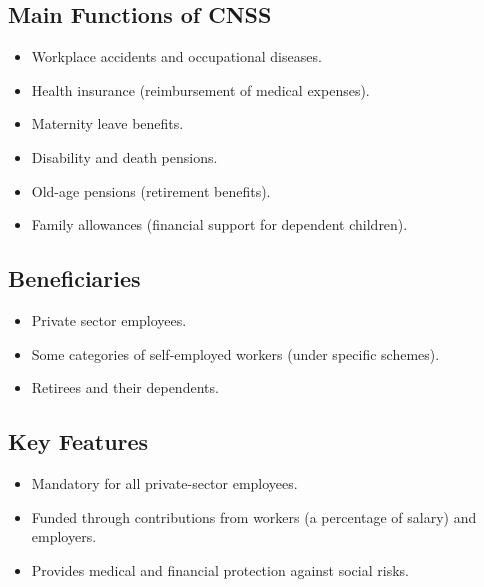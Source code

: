 \subsection{Main Functions of CNSS}
\begin{itemize}
    \item Workplace accidents and occupational diseases.
    \item Health insurance (reimbursement of medical expenses).
    \item Maternity leave benefits.
    \item Disability and death pensions.
    \item Old-age pensions (retirement benefits).
    \item Family allowances (financial support for dependent children).
\end{itemize}

\subsection{Beneficiaries}
\begin{itemize}
    \item Private sector employees.
    \item Some categories of self-employed workers (under specific schemes).
    \item Retirees and their dependents.
\end{itemize}

\subsection{Key Features}
\begin{itemize}
    \item Mandatory for all private-sector employees.
    \item Funded through contributions from workers (a percentage of salary) and employers.
    \item Provides medical and financial protection against social risks.
\end{itemize}
